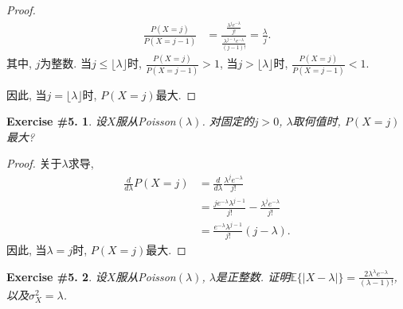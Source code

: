\documentclass[UTF8, a4paper]{article}
\newtheorem{exercise}{Exercise \#5.}
\begin{document}
\begin{proof}
$$
\begin{aligned}
    \frac{P(X = j)}{P(X = j-1)} &= \frac{\frac{\lambda^j e^{-\lambda}}{j!}}{\frac{\lambda^{j-1}e^{-\lambda}}{(j-1)!}} = \frac{\lambda}{j}.
\end{aligned}
$$
其中, \(j\)为整数.
当\(j \leq \lfloor \lambda \rfloor\)时, \(\frac{P(X = j)}{P(X = j-1)} > 1\), 当\(j > \lfloor \lambda \rfloor\)时, \(\frac{P(X = j)}{P(X = j-1)} < 1\).

因此, 当\(j = \lfloor \lambda \rfloor\)时, \(P(X = j)\)最大.
\end{proof}


\begin{framed}
\begin{exercise}
设\(X\)服从Poisson\((\lambda)\). 对固定的\(j>0\), \(\lambda\)取何值时, \(P(X = j)\)最大?
\end{exercise}
\end{framed}

\begin{proof}
关于\(\lambda\)求导, 
$$
\begin{aligned}
    \frac{d}{d\lambda} P(X = j) &= \frac{d}{d\lambda} \frac{\lambda^j e^{-\lambda}}{j!} \\
    &= \frac{je^{-\lambda}\lambda^{j-1}}{j!} - \frac{\lambda^j e^{-\lambda}}{j!} \\
    &= \frac{e^{-\lambda}\lambda^{j-1}}{j!} \left(j - \lambda\right).
\end{aligned}
$$
因此, 当\(\lambda = j\)时, \(P(X = j)\)最大.
\end{proof}

\begin{framed}
\begin{exercise}
设\(X\)服从Poisson\((\lambda)\), \(\lambda\)是正整数. 证明\(\mathbb{E}\{|X - \lambda|\} = \frac{2\lambda^\lambda e^{-\lambda}}{(\lambda - 1)!}\), 以及\(\sigma_X^2 = \lambda\).
\end{exercise}
\end{framed}
\end{document}
